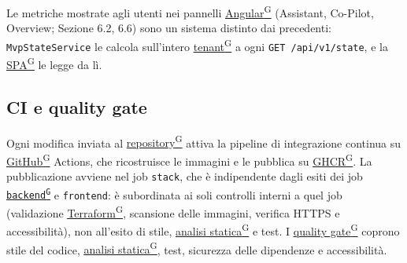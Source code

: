 \documentclass[a4paper,12pt]{article}
\providecommand{\glslink}[2]{\href{https://alittlebyte-19.github.io/Documentazione/glossario.html\#gls-#1}{\underline{#2}\textsuperscript{\scriptsize G}}}
\begin{document}
Le metriche mostrate agli utenti nei pannelli \glslink{angular}{Angular} (Assistant, Co-Pilot, Overview; Sezione 6.2, 6.6) sono un sistema distinto dai precedenti: \texttt{MvpStateService} le calcola sull'intero \glslink{tenant}{tenant} a ogni \texttt{GET /api/v1/state}, e la \glslink{spa-single-page-application}{SPA} le legge da lì.

\subsection{CI e quality gate}

Ogni modifica inviata al \glslink{repository}{repository} attiva la pipeline di integrazione continua su \glslink{github}{GitHub} Actions, che ricostruisce le immagini e le pubblica su \glslink{ghcr-github-container-registry}{GHCR}. La pubblicazione avviene nel job \texttt{stack}, che è indipendente dagli esiti dei job \texttt{\glslink{backend}{backend}} e \texttt{frontend}: è subordinata ai soli controlli interni a quel job (validazione \glslink{terraform}{Terraform}, scansione delle immagini, verifica HTTPS e accessibilità), non all'esito di stile, \glslink{analisi-statica}{analisi statica} e test. I \glslink{quality-gate}{quality gate} coprono stile del codice, \glslink{analisi-statica}{analisi statica}, test, sicurezza delle dipendenze e accessibilità.
\end{document}
